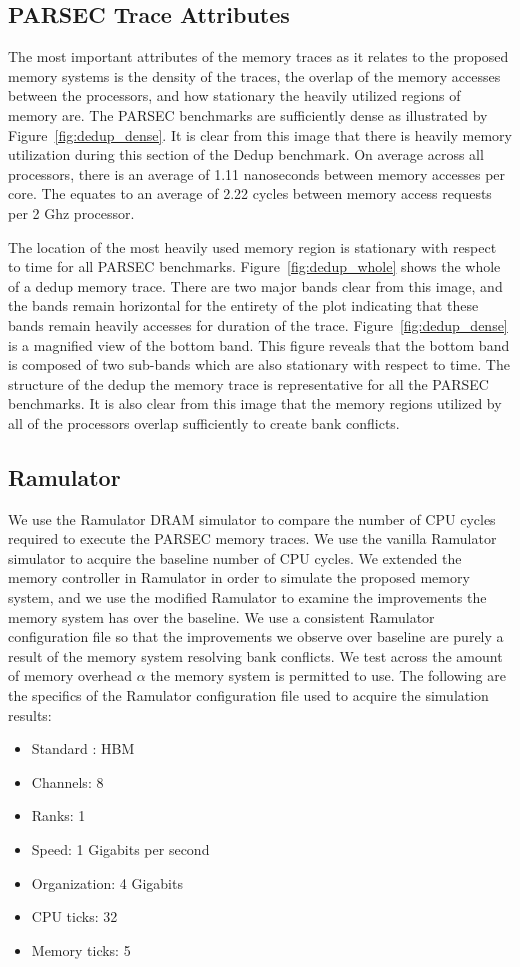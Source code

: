 \subsection{PARSEC Trace Attributes}

The most important attributes of the memory traces as it relates to the proposed memory systems is the density of the traces, the overlap of the memory accesses between the processors, and how stationary the heavily utilized regions of memory are. The PARSEC benchmarks are sufficiently dense as illustrated by Figure~\ref{fig:dedup_dense}. It is clear from this image that there is heavily memory utilization during this section of the Dedup benchmark. On average across all processors, there is an average of 1.11 nanoseconds between memory accesses per core. The equates to an average of 2.22 cycles between memory access requests per 2 Ghz processor. 

The location of the most heavily used memory region is stationary with respect to time for all PARSEC benchmarks. Figure~\ref{fig:dedup_whole} shows the whole of a dedup memory trace. There are two major bands clear from this image, and the bands remain horizontal for the entirety of the plot indicating that these bands remain heavily accesses for duration of the trace. Figure~\ref{fig:dedup_dense} is a magnified view of the bottom band. This figure reveals that the bottom band is composed of two sub-bands which are also stationary with respect to time. The structure of the dedup the memory trace is representative for all the PARSEC benchmarks. It is also clear from this image that the memory regions utilized by all of the processors overlap sufficiently to create bank conflicts.

\subsection{Ramulator}

We use the Ramulator DRAM simulator to compare the number of CPU cycles required to execute the PARSEC memory traces. We use the vanilla Ramulator simulator to acquire the baseline number of CPU cycles. We extended the memory controller in Ramulator in order to simulate the proposed memory system, and we use the modified Ramulator to examine the improvements the memory system has over the baseline. We use a consistent Ramulator configuration file so that the improvements we observe over baseline are purely a result of the memory system resolving bank conflicts. We test across the amount of memory overhead $\alpha$ the memory system is permitted to use. 
The following are the specifics of the Ramulator configuration file used to acquire the simulation results:
\begin{itemize}
\item Standard : HBM
\item Channels: 8
\item Ranks: 1
\item Speed: 1 Gigabits per second
\item Organization: 4 Gigabits
\item CPU ticks: 32
\item Memory ticks: 5
\end{itemize}
